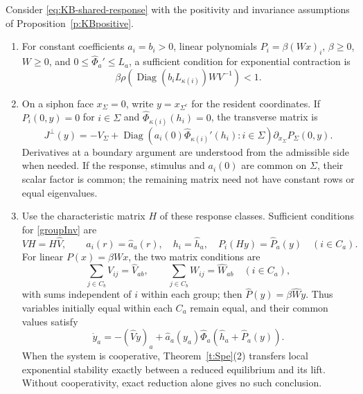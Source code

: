 Consider \eqref{eq:KB-shared-response} with the positivity and
invariance assumptions of Proposition~\ref{p:KBpositive}.
\begin{enumerate}
\item For constant coefficients $a_i=b_i>0$, linear polynomials
$P_i=\beta(Wx)_i$, $\beta\ge0$, $W\ge0$, and
$0\le\widehat\Phi_a'\le L_a$, a sufficient condition for exponential contraction is
\begin{equation}\label{eq:KB-shared-contraction}
 \beta\rho\!\left(
 \operatorname{Diag}(b_iL_{\kappa(i)})WV^{-1}\right)<1.
\end{equation}
\item On a siphon face $x_\Sigma=0$, write $y=x_{\Sigma^c}$ for the resident
coordinates. If $P_i(0,y)=0$ for $i\in \Sigma$ and
$\widehat\Phi_{\kappa(i)}(h_i)=0$, the transverse matrix is
\begin{equation}\label{eq:KB-shared-transverse}
 J^\perp(y)=-V_\Sigma+
 \operatorname{Diag}\!\left(
 a_i(0)\widehat\Phi_{\kappa(i)}'(h_i):i\in \Sigma\right)
 \partial_{x_\Sigma}P_\Sigma(0,y).
\end{equation}
Derivatives at a boundary argument are understood from the admissible
side when needed. If the response, stimulus and $a_i(0)$ are common
on $\Sigma$, their scalar factor is common; the remaining matrix need
not have constant rows or equal eigenvalues.
\item Use the characteristic matrix $H$ of these response classes.
Sufficient conditions for \eqref{groupInv} are
\[
 VH=H\widehat V,\qquad
 a_i(r)=\widehat a_a(r),\quad h_i=\widehat h_a,\quad
 P_i(Hy)=\widehat P_a(y)\quad(i\in C_a).
\]
For linear $P(x)=\beta Wx$, the two matrix conditions are
\[
 \sum_{j\in C_b}V_{ij}=\widehat V_{ab},\qquad
 \sum_{j\in C_b}W_{ij}=\widehat W_{ab}
 \quad(i\in C_a),
\]
with sums independent of $i$ within each group; then
$\widehat P(y)=\beta\widehat Wy$.
Thus variables initially equal within each $C_a$ remain equal,
and their common values satisfy
\[
 \dot y_a=-(\widehat V y)_a+
 \widehat a_a(y_a)\widehat\Phi_a(\widehat h_a+\widehat P_a(y)).
\]
When the system is cooperative, Theorem~\ref{t:Spe}(2) transfers local
exponential stability exactly between a reduced equilibrium and its lift.
Without cooperativity, exact reduction alone gives no such conclusion.
\end{enumerate}
\eeP
